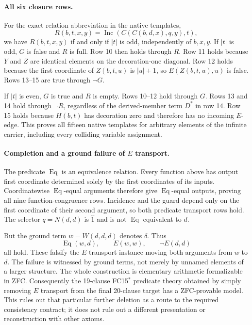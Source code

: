 \paragraph{All six closure rows.}
For the exact relation abbreviation in the native templates,
\[
R(b,t,x,y)=\operatorname{Inc}(C(C(b,d,x),q,y),t),
\]
we have $R(b,t,x,y)$ if and only if $|t|$ is odd, independently of
$b,x,y$. If $|t|$ is odd, $G$ is false and $R$ is full. Row 10 then
holds through $R$. Row 11 holds because $Y$ and $Z$ are identical
elements on the decoration-one diagonal. Row 12 holds because the
first coordinate of $Z(b,t,u)$ is $|u|+1$, so $E(Z(b,t,u),u)$ is
false. Rows 13--15 are true through $\neg G$.

If $|t|$ is even, $G$ is true and $R$ is empty. Rows 10--12 hold
through $G$. Rows 13 and 14 hold through $\neg R$, regardless of the
derived-member term $D^*$ in row 14. Row 15 holds because $H(b,t)$
has decoration zero and therefore has no incoming $E$-edge.
This proves all fifteen native templates for arbitrary elements of
the infinite carrier, including every colliding variable assignment.

\paragraph{Completion and a ground failure of $E$ transport.}
The predicate $\operatorname{Eq}$ is an equivalence relation.
Every function above has output first coordinate determined solely by
the first coordinates of its inputs. Coordinatewise
$\operatorname{Eq}$-equal arguments therefore give
$\operatorname{Eq}$-equal outputs, proving all nine
function-congruence rows. Incidence and the guard depend only on the
first coordinate of their second argument, so both predicate transport
rows hold. The selector $q=N(d,d)$ is $\widehat1$ and is not
$\operatorname{Eq}$-equivalent to $d$.

But the ground term $w=W(d,d,d)$ denotes $\delta$. Thus
\[
\operatorname{Eq}(w,d),\qquad E(w,w),\qquad \neg E(d,d)
\]
all hold. These falsify the $E$-transport instance moving both arguments
from $w$ to $d$. The failure is witnessed by ground terms, not merely
by unnamed elements of a larger structure. The whole construction is
elementary arithmetic formalizable in ZFC. Consequently the
19-clause FC15$^*$ predicate theory obtained by simply removing $E$
transport from the final 20-clause target has a ZFC-provable model.
This rules out that particular further deletion as a route to the
required consistency contract; it does not rule out a different
presentation or reconstruction with other axioms.

